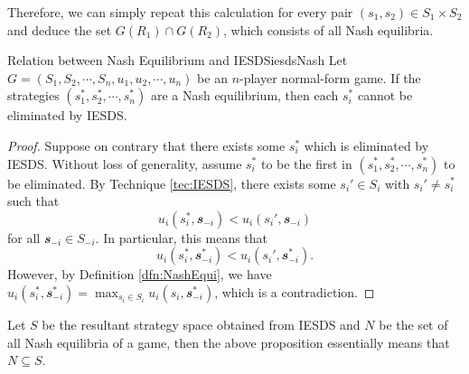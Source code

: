 \documentclass[math]{amznotes}
\theoremstyle{remark}
\begin{document}
Therefore, we can simply repeat this calculation for every pair $\left(s_1, s_2\right) \in S_1 \times S_2$ and deduce the set $G\left(R_1\right) \cap G\left(R_2\right)$, which consists of all Nash equilibria.
\begin{probox}{Relation between Nash Equilibrium and IESDS}{iesdsNash}
    Let $G = \left(S_1, S_2, \cdots, S_n, u_1, u_2, \cdots, u_n\right)$ be an $n$-player normal-form game. If the strategies $\left(s_1^*, s_2^*, \cdots, s_n^*\right)$ are a Nash equilibrium, then each $s_i^*$ cannot be eliminated by IESDS.
    \tcblower
    \begin{proof}
        Suppose on contrary that there exists some $s_i^*$ which is eliminated by IESDS. Without loss of generality, assume $s_i^*$ to be the first in $\left(s_1^*, s_2^*, \cdots, s_n^*\right)$ to be eliminated. By Technique \ref{tec:IESDS}, there exists some $s_i' \in S_i$ with $s_i' \neq s_i^*$ such that 
        \begin{equation*}
            u_i\left(s_i^*, \mathbfit{s}_{-i}\right) < u_i\left(s_i', \mathbfit{s}_{-i}\right)
        \end{equation*}
        for all $\mathbfit{s}_{-i} \in S_{-i}$. In particular, this means that 
        \begin{equation*}
            u_i\left(s_i^*, \mathbfit{s}_{-i}^*\right) < u_i\left(s_i', \mathbfit{s}_{-i}^*\right).
        \end{equation*}
        However, by Definition \ref{dfn:NashEqui}, we have $u_i\left(s_i^*, \mathbfit{s}_{-i}^*\right) = \max_{s_i \in S_i}u_i\left(s_i, \mathbfit{s}_{-i}^*\right)$, which is a contradiction.
    \end{proof}
\end{probox}
Let $S$ be the resultant strategy space obtained from IESDS and $N$ be the set of all Nash equilibria of a game, then the above proposition essentially means that $N \subseteq S$. 
\end{document}
